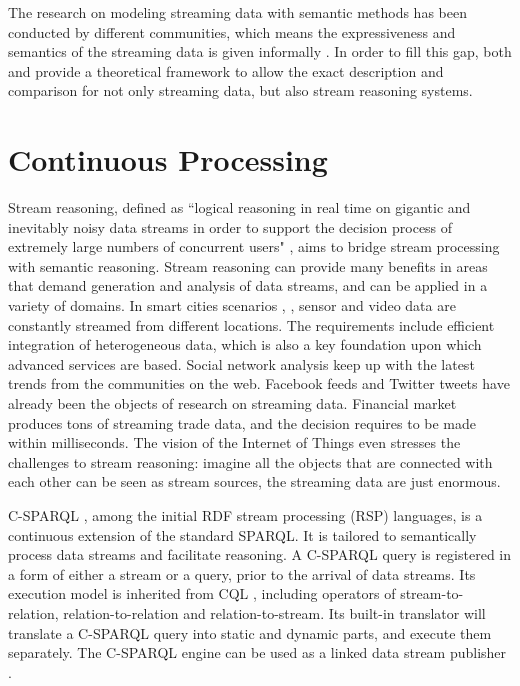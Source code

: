 The research on modeling streaming data with semantic methods has been conducted by different communities, which means the expressiveness and semantics of the streaming data is given informally \cite{della2009s}.
In order to fill this gap, both \cite{beck2015towards} and \cite{beck2015lars} provide a theoretical framework to allow the exact description and comparison for not only streaming data, but also stream reasoning systems.
%
\section{Continuous Processing}
Stream reasoning, defined as ``logical reasoning in real time on gigantic and inevitably noisy data streams in order to support the decision process of extremely large numbers of concurrent users" \cite{stuckenschmidt2010towards}, aims to bridge stream processing with semantic reasoning. 
Stream reasoning can provide many benefits in areas that demand generation and analysis of data streams, and can be applied in a variety of domains.
In smart cities scenarios \cite{tallevi2013real}, \cite{lecue2012capturing}, sensor and video data are constantly streamed from different locations.
The requirements include efficient integration of heterogeneous data, which is also a key foundation upon which advanced services are based. 
Social network analysis \cite{barbieri2009continuous} keep up with the latest trends from the communities on the web.
Facebook feeds and Twitter tweets have already been the objects of research on streaming data.
Financial market \cite{stonebraker20058} produces tons of streaming trade data, and the decision requires to be made within milliseconds.
The vision of the Internet of Things \cite{atzori2010internet} even stresses the challenges to stream reasoning: imagine all the objects that are connected with each other can be seen as stream sources, the streaming data are just enormous. 

C-SPARQL \cite{barbieri2009c}, among the initial RDF stream processing (RSP) \cite{rsp2013rdf} languages, is a continuous extension of the standard SPARQL. 
It is tailored to semantically process data streams and facilitate reasoning. 
A C-SPARQL query is registered in a form of either a stream or a query, prior to the arrival of data streams.
Its execution model is inherited from CQL \cite{arasu2006cql}, including operators of stream-to-relation, relation-to-relation and relation-to-stream. 
Its built-in translator will translate a C-SPARQL query into static and dynamic parts, and execute them separately. 
The C-SPARQL engine can be used as a linked data stream publisher \cite{barbieri2010proposal}. 

